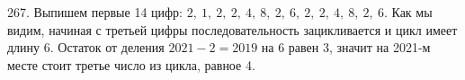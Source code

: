 267. Выпишем первые 14 цифр: $2,\ 1,\ 2,\ 2,\ 4,\ 8,\ 2,\ 6,\ 2,\ 2,\ 4,\ 8,\ 2,\ 6.$ Как мы видим, начиная с третьей цифры последовательность зацикливается и цикл имеет длину 6. Остаток от деления $2021-2=2019$ на 6 равен 3, значит на 2021-м месте стоит третье число из цикла, равное 4.\\

